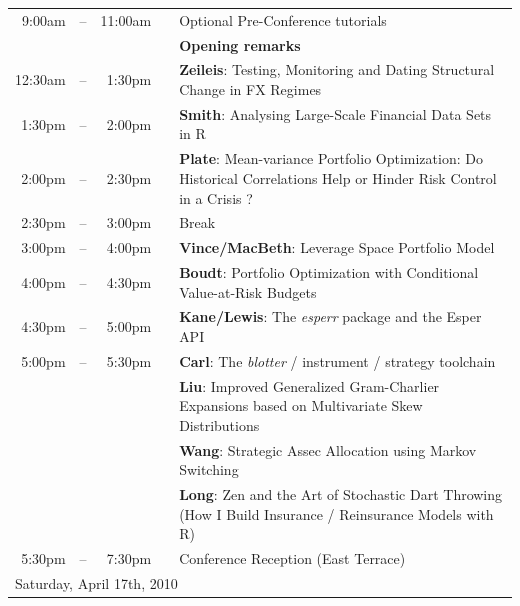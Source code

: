 \documentclass[11pt]{article}
\newcommand{\mylinecolor}[1]{\color{#1}\vspace{-8pt}}  %
\begin{document}
\begin{tabular}{rlrlp{5in}}
  9:00am & -- & 11:00am &   & \small{\mylinecolor{Breaks} Optional Pre-Conference tutorials} \\
  \phantom{X 12:30am}  & \phantom{m} &  & & \textbf{\color{Breaks} Opening remarks} \\
  12:30am& -- & 1:30pm &    & \textbf{\color{KeynoteTalk} Zeileis}: \small{Testing, Monitoring and Dating Structural Change in FX Regimes} \\
  1:30pm & -- & 2:00pm &    & \textbf{\color{Talk} Smith}: \small{Analysing Large-Scale Financial Data Sets in R} \\
  2:00pm & -- & 2:30pm &    & \textbf{\color{Talk} Plate}: \small{Mean-variance Portfolio Optimization: Do Historical Correlations Help or Hinder Risk Control in a Crisis ?} \\[0pt]
  2:30pm & -- & 3:00pm &    & \small{\mylinecolor{Breaks} Break} \\
  3:00pm & -- & 4:00pm &    & \textbf{\color{KeynoteTalk} Vince/MacBeth}: \small{Leverage Space Portfolio Model} \\
  4:00pm & -- & 4:30pm &    & \textbf{\color{Talk} Boudt}: \small{Portfolio Optimization with Conditional Value-at-Risk Budgets} \\
  4:30pm & -- & 5:00pm &    & \textbf{\color{Talk} Kane/Lewis}: \small{The \emph{esperr} package and the Esper API} \\
  5:00pm & -- & 5:30pm &    & \textbf{\color{LightningTalk} Carl}: \small{The \emph{blotter} / instrument / strategy toolchain} \\
         &    &        &    & \textbf{\color{LightningTalk} Liu}: \small{Improved Generalized Gram-Charlier Expansions based on Multivariate Skew Distributions} \\
         &    &        &    & \textbf{\color{LightningTalk} Wang}: \small{Strategic Assec Allocation using Markov Switching} \\
         &    &        &    & \textbf{\color{LightningTalk} Long}: \small{Zen and the Art of Stochastic Dart Throwing (How I Build Insurance / Reinsurance Models with R)} \\[0pt]
  5:30pm & -- & 7:30pm &    & \small{\mylinecolor{Breaks} Conference Reception (East Terrace)}  \\[18pt]

  \multicolumn{5}{l}{\large Saturday, April 17th, 2010} \\


\end{tabular}
\end{document}
